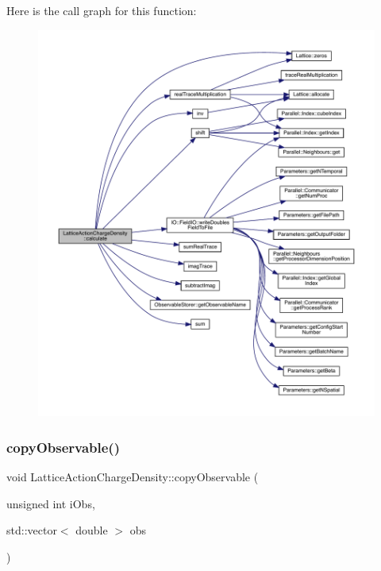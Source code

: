 Here is the call graph for this function\+:\nopagebreak
\begin{figure}[H]
\begin{center}
\leavevmode
\includegraphics[width=350pt]{class_lattice_action_charge_density_a3dddc75188042c645fbdd1c8b3e80c8a_cgraph}
\end{center}
\end{figure}
\mbox{\label{class_lattice_action_charge_density_aef63c9fba819e838a87b509d53be248b}} 
\subsubsection{\texorpdfstring{copyObservable()}{copyObservable()}}
{\footnotesize\ttfamily void Lattice\+Action\+Charge\+Density\+::copy\+Observable (\begin{DoxyParamCaption}\item[{unsigned int}]{i\+Obs,  }\item[{std\+::vector$<$ double $>$}]{obs }\end{DoxyParamCaption})\hspace{0.3cm}{\ttfamily [virtual]}}



